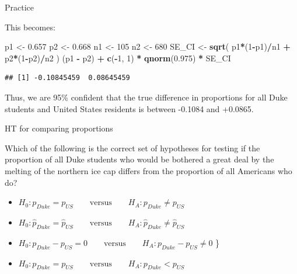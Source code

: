 \documentclass[
  ignorenonframetext,
]{beamer}
\newenvironment{Shaded}{\begin{snugshade}}{\end{snugshade}}
\newcommand{\DecValTok}[1]{\textcolor[rgb]{0.00,0.00,0.81}{#1}}
\newcommand{\FloatTok}[1]{\textcolor[rgb]{0.00,0.00,0.81}{#1}}
\newcommand{\KeywordTok}[1]{\textcolor[rgb]{0.13,0.29,0.53}{\textbf{#1}}}
\newcommand{\NormalTok}[1]{#1}
\newcommand{\OperatorTok}[1]{\textcolor[rgb]{0.81,0.36,0.00}{\textbf{#1}}}
\newcommand{\StringTok}[1]{\textcolor[rgb]{0.31,0.60,0.02}{#1}}
\providecommand{\tightlist}{%
  \setlength{\itemsep}{0pt}\setlength{\parskip}{0pt}}
\begin{document}
\begin{frame}[fragile]{Practice}
\protect\hypertarget{practice-1}{}

This becomes:

\begin{Shaded}
\begin{Highlighting}[]
\NormalTok{p1 <-}\StringTok{ }\FloatTok{0.657}
\NormalTok{p2 <-}\StringTok{ }\FloatTok{0.668}
\NormalTok{n1 <-}\StringTok{ }\DecValTok{105}
\NormalTok{n2 <-}\StringTok{ }\DecValTok{680}
\NormalTok{SE_CI <-}\StringTok{ }\KeywordTok{sqrt}\NormalTok{( p1}\OperatorTok{*}\NormalTok{(}\DecValTok{1}\OperatorTok{-}\NormalTok{p1)}\OperatorTok{/}\NormalTok{n1 }\OperatorTok{+}\StringTok{ }\NormalTok{p2}\OperatorTok{*}\NormalTok{(}\DecValTok{1}\OperatorTok{-}\NormalTok{p2)}\OperatorTok{/}\NormalTok{n2 )}
\NormalTok{(p1 }\OperatorTok{-}\StringTok{ }\NormalTok{p2) }\OperatorTok{+}\StringTok{ }\KeywordTok{c}\NormalTok{(}\OperatorTok{-}\DecValTok{1}\NormalTok{, }\DecValTok{1}\NormalTok{) }\OperatorTok{*}\StringTok{ }\KeywordTok{qnorm}\NormalTok{(}\FloatTok{0.975}\NormalTok{) }\OperatorTok{*}\StringTok{ }\NormalTok{SE_CI}
\end{Highlighting}
\end{Shaded}

\begin{verbatim}
## [1] -0.10845459  0.08645459
\end{verbatim}

Thus, we are 95\% confident that the true difference in proportions for
all Duke students and United States residents is between -0.1084 and
+0.0865.

\end{frame}

\begin{frame}{HT for comparing proportions}
\protect\hypertarget{ht-for-comparing-proportions}{}

Which of the following is the correct set of hypotheses for testing if
the proportion of all Duke students who would be bothered a great deal
by the melting of the northern ice cap differs from the proportion of
all Americans who do?

\begin{itemize}
\tightlist
\item
  \(H_0: p_{Duke} = p_{US} \qquad \text{versus} \qquad H_A: p_{Duke} \ne p_{US}\)
\item
  \(H_0: \hat{p}_{Duke} = \hat{p}_{US} \qquad \text{versus} \qquad H_A: \hat{p}_{Duke} \ne \hat{p}_{US}\)
\item
  \(H_0: p_{Duke} - p_{US} = 0 \qquad \text{versus} \qquad H_A: p_{Duke} - p_{US} \ne 0\)
  \}
\item
  \(H_0: p_{Duke} = p_{US} \qquad \text{versus} \qquad H_A: p_{Duke} < p_{US}\)
\end{itemize}

\end{frame}
\end{document}

